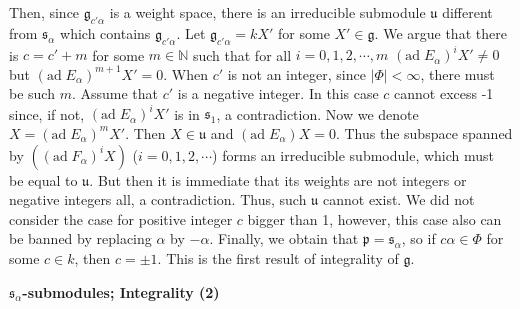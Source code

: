 \documentclass{article}
\newcommand{\NaN}{\mathbb{N}}
\newcommand{\lie}[1]{\mathfrak{#1}}
\newcommand{\ad}[1]{\mathrm{ad}\; #1}
\begin{document}
Then, since $\lie{g}_{c'\alpha}$ is a weight space, there is an irreducible submodule $\lie{u}$ different from $\lie{s}_\alpha$ which contains $\lie{g}_{c'\alpha}$.
Let $\lie{g}_{c'\alpha} = kX'$ for some $X' \in \lie{g}$.
We argue that there is $c = c' + m$ for some $m \in \NaN$ such that for all $i = 0, 1, 2, \cdots, m$ $(\ad{E_\alpha})^i X' \ne 0$ but $(\ad{E_\alpha})^{m + 1} X' = 0$.
When $c'$ is not an integer, since $|\Phi| < \infty$, there must be such $m$.
Assume that $c'$ is a negative integer.
In this case $c$ cannot excess -1 since, if not, $(\ad{E_\alpha})^i X'$ is in $\lie{s}_1$, a contradiction.
Now we denote $X = (\ad{E_\alpha})^m X'$.
Then $X \in \lie{u}$ and $(\ad{E_\alpha})X = 0$.
Thus the subspace spanned by $((\ad{F_\alpha})^i X)$ ($i = 0, 1, 2, \cdots$) forms an irreducible submodule, which must be equal to $\lie{u}$.
But then it is immediate that its weights are not integers or negative integers all, a contradiction.
Thus, such $\lie{u}$ cannot exist.
We did not consider the case for positive integer $c$ bigger than 1, however, this case also can be banned by replacing $\alpha$ by $-\alpha$.
Finally, we obtain that $\lie{p} = \lie{s}_\alpha$, so if $c\alpha \in \Phi$ for some $c \in k$, then $c = \pm 1$.
This is the first result of integrality of $\lie{g}$.

\newpage

\textbf{$\lie{s}_\alpha$-submodules; Integrality (2)}
\end{document}

